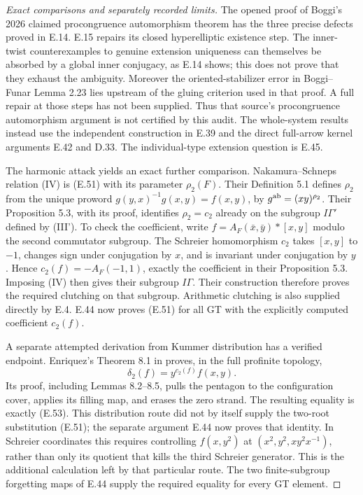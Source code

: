 \begin{proof}[Exact comparisons and separately recorded limits]
The opened proof of Boggi's 2026 claimed procongruence
automorphism theorem has the three precise defects
proved in E.14.  E.15 repairs its closed hyperelliptic
existence step.  The inner-twist counterexamples to
genuine extension uniqueness can themselves be
absorbed by a global inner conjugacy, as E.14 shows;
this does not prove that they exhaust the ambiguity.
Moreover the oriented-stabilizer error in
Boggi--Funar Lemma 2.23 lies upstream of the gluing
criterion used in that proof.  A full repair at those
steps has not been supplied. Thus that source's
procongruence automorphism argument is not certified
by this audit. The whole-system results instead use
the independent construction in E.39 and the direct
full-arrow kernel arguments E.42 and D.33.
The individual-type extension question is E.45.

The harmonic attack yields an exact further comparison.
Nakamura--Schneps relation (IV) \cite{ET_NS2000} is (E.51) with its
parameter $\rho_2(F)$.  Their Definition 5.1 defines
$\rho_2$ from the unique proword
$g(y,x)^{-1}g(x,y)=f(x,y)$, by
$g^{\rm ab}=(xy)^{\rho_2}$.  Their Proposition 5.3,
with its proof, identifies $\rho_2=c_2$ already on the subgroup
$I\Gamma\prime$ defined by (III').  To check the coefficient,
write $f=A_F(\bar x,\bar y)*[x,y]$ modulo the second
commutator subgroup.  The Schreier homomorphism $c_2$
takes $[x,y]$ to $-1$, changes sign under conjugation
by $x$, and is invariant under conjugation by $y$.
Hence $c_2(f)=-A_F(-1,1)$, exactly the coefficient
in their Proposition 5.3.  Imposing (IV) then gives
their subgroup $I\Gamma$.
Their construction therefore proves the required
clutching on that subgroup.  Arithmetic clutching is
also supplied directly by E.4. E.44 now proves
(E.51) for all GT with the explicitly computed
coefficient $c_2(f)$.

A separate attempted derivation from Kummer distribution
has a verified endpoint.  Enriquez's Theorem 8.1 in
\cite{ET_Enriquez2007} proves, in the full profinite
topology,
\[
                  \delta_2(f)=y^{c_2(f)}f(x,y).             \tag{E.53}
\]
Its proof, including Lemmas 8.2--8.5, pulls the pentagon
to the configuration cover, applies its filling map,
and erases the zero strand.  The resulting equality
is exactly (E.53). This distribution route did not
by itself supply the two-root substitution (E.51);
the separate argument E.44 now proves that identity.  In Schreier coordinates
this requires controlling
$f(x,y^2)$ at
$(x^2,y^2,xy^2x^{-1})$, rather than only its quotient
that kills the third Schreier generator.  This is the
additional calculation left by that particular route.
The two finite-subgroup forgetting maps of E.44
supply the required equality for every GT element.


\end{proof}
